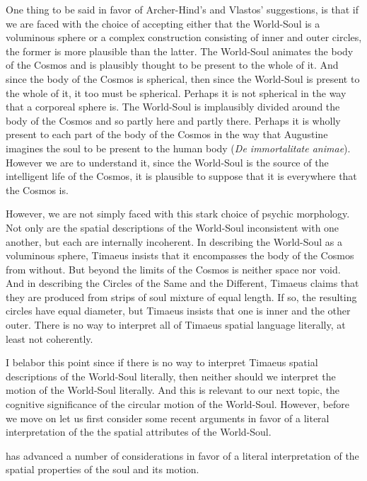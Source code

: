 One thing to be said in favor of Archer-Hind's and Vlastos' suggestions, is that if we are faced with the choice of accepting either that the World-Soul is a voluminous sphere or a complex construction consisting of inner and outer circles, the former is more plausible than the latter. The World-Soul animates the body of the Cosmos and is plausibly thought to be present to the whole of it. And since the body of the Cosmos is spherical, then since the World-Soul is present to the whole of it, it too must be spherical. Perhaps it is not spherical in the way that a corporeal sphere is. The World-Soul is implausibly divided around the body of the Cosmos and so partly here and partly there. Perhaps it is wholly present to each part of the body of the Cosmos in the way that Augustine imagines the soul to be present to the human body (\emph{De immortalitate animae}). However we are to understand it, since the World-Soul is the source of the intelligent life of the Cosmos, it is plausible to suppose that it is everywhere that the Cosmos is.

However, we are not simply faced with this stark choice of psychic morphology. Not only are the spatial descriptions of the World-Soul inconsistent with one another, but each are internally incoherent. In describing the World-Soul as a voluminous sphere, Timaeus insists that it encompasses the body of the Cosmos from without. But beyond the limits of the Cosmos is neither space nor void. And in describing the Circles of the Same and the Different, Timaeus claims that they are produced from strips of soul mixture of equal length. If so, the resulting circles have equal diameter, but Timaeus insists that one is inner and the other outer. There is no way to interpret all of Timaeus spatial language literally, at least not coherently.

I belabor this point since if there is no way to interpret Timaeus spatial descriptions of the World-Soul literally, then neither should we interpret the motion of the World-Soul literally. And this is relevant to our next topic, the cognitive significance of the circular motion of the World-Soul. However, before we move on let us first consider some recent arguments in favor of a literal interpretation of the the spatial attributes of the World-Soul.

\citet{Sedley:1997kr} has advanced a number of considerations in favor of a literal interpretation of the spatial properties of the soul and its motion.

